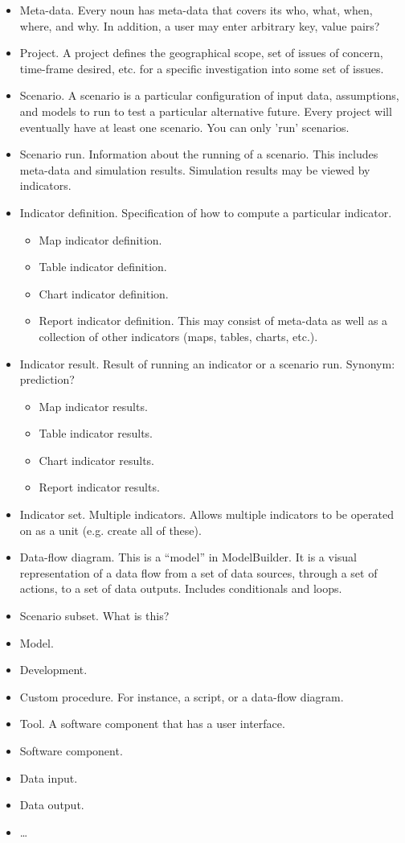\documentclass[titlepage]{article}
\begin{document}
\begin{itemize}
  \item Meta-data.  Every noun has meta-data that covers its who, what, when, where, and why.  In addition, a user may enter arbitrary key, value pairs?
  \item Project.  A project defines the geographical scope, set of issues of concern, time-frame desired, etc. for a specific investigation into some set of issues.
  \item Scenario.  A scenario is a particular configuration of input data, assumptions, and models to run to test a particular alternative future.  Every project will eventually have at least one scenario.  You can only 'run' scenarios.
  \item Scenario run.  Information about the running of a scenario.  This includes meta-data and simulation results.  Simulation results may be viewed by indicators.
  \item Indicator definition.  Specification of how to compute a particular indicator.  
  \begin{itemize}
	  \item Map indicator definition.
	  \item Table indicator definition.
	  \item Chart indicator definition.
	  \item Report indicator definition.  This may consist of meta-data as well as a collection of other indicators (maps, tables, charts, etc.).
  \end{itemize}
  \item Indicator result.  Result of running an indicator or a scenario run.  Synonym: prediction?
  \begin{itemize}
	  \item Map indicator results.
	  \item Table indicator results.
	  \item Chart indicator results.
	  \item Report indicator results.  
  \end{itemize}
  \item Indicator set.  Multiple indicators.  Allows multiple indicators to be operated on as a unit (e.g. create all of these).
  \item Data-flow diagram.  This is a ``model'' in ModelBuilder.  It is a visual representation of a data flow from a set of data sources, through a set of actions, to a set of data outputs.  Includes conditionals and loops.
  \item Scenario subset.  What is this?
  \item Model. 
  \item Development.
  \item Custom procedure.  For instance, a script, or a data-flow diagram.
  \item Tool.  A software component that has a user interface.
  \item Software component.
  \item Data input.
  \item Data output.
  \item \ldots
\end{itemize}
\end{document}
